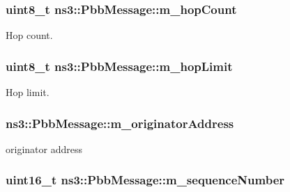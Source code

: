 \subsubsection[{\texorpdfstring{m\+\_\+hop\+Count}{m_hopCount}}]{\setlength{\rightskip}{0pt plus 5cm}uint8\+\_\+t ns3\+::\+Pbb\+Message\+::m\+\_\+hop\+Count\hspace{0.3cm}{\ttfamily [private]}}\hypertarget{classns3_1_1PbbMessage_ad38212959ec4763cbc4fdc23ab0a17ef}{}\label{classns3_1_1PbbMessage_ad38212959ec4763cbc4fdc23ab0a17ef}


Hop count. 

\subsubsection[{\texorpdfstring{m\+\_\+hop\+Limit}{m_hopLimit}}]{\setlength{\rightskip}{0pt plus 5cm}uint8\+\_\+t ns3\+::\+Pbb\+Message\+::m\+\_\+hop\+Limit\hspace{0.3cm}{\ttfamily [private]}}\hypertarget{classns3_1_1PbbMessage_a5d8a3495ddf861ec761139aa2a2e8d96}{}\label{classns3_1_1PbbMessage_a5d8a3495ddf861ec761139aa2a2e8d96}


Hop limit. 

\subsubsection[{\texorpdfstring{m\+\_\+originator\+Address}{m_originatorAddress}}]{ ns3\+::\+Pbb\+Message\+::m\+\_\+originator\+Address\hspace{0.3cm}{\ttfamily [private]}}\hypertarget{classns3_1_1PbbMessage_a276c7a94804be19b5436a7605deeb271}{}\label{classns3_1_1PbbMessage_a276c7a94804be19b5436a7605deeb271}


originator address 

\subsubsection[{\texorpdfstring{m\+\_\+sequence\+Number}{m_sequenceNumber}}]{\setlength{\rightskip}{0pt plus 5cm}uint16\+\_\+t ns3\+::\+Pbb\+Message\+::m\+\_\+sequence\+Number\hspace{0.3cm}{\ttfamily [private]}}\hypertarget{classns3_1_1PbbMessage_a0783da135968860d4c7e79d572355838}{}\label{classns3_1_1PbbMessage_a0783da135968860d4c7e79d572355838}


